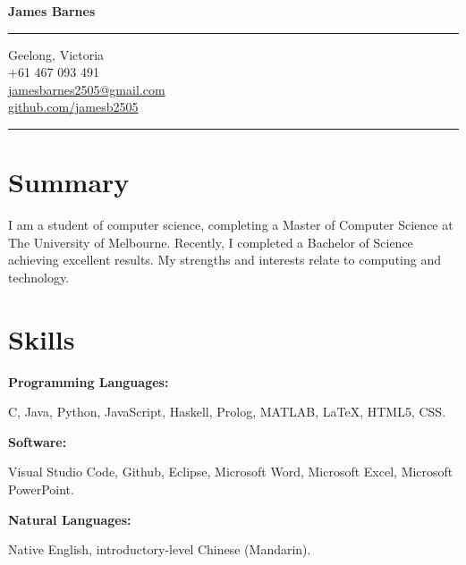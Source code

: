 \documentclass[10pt]{article}
\begin{document}
\pagestyle{empty} 

\begin{minipage}[t]{.35\textwidth}
\vspace*{0pt}

\begin{center}
{\Huge \bfseries James Barnes\par}
\end{center}

\bigskip
\hrule
\bigskip

\begin{center}
Geelong, Victoria \\
+61 467 093 491 \\
\href{mailto:jamesbarnes2505@gmail.com}{jamesbarnes2505@gmail.com} \\
\href{http://github.com/jamesb2505}{github.com/jamesb2505}
\end{center}

\bigskip
\hrule
\bigskip

\section{Summary}

\begin{flushleft}
I am a student of computer science, completing a Master of Computer Science at The University of Melbourne. 
Recently, I completed a Bachelor of Science achieving excellent results.
My strengths and interests relate to computing and technology.
\end{flushleft} 

\medskip

\section{Skills}

\textbf{Programming Languages:}
\begin{flushleft}
C, Java, Python, JavaScript, Haskell, Prolog, MATLAB, {\selectfont \LaTeX{}}, HTML5, CSS. \newline
\end{flushleft}

\textbf{Software:}
\begin{flushleft}
Visual Studio Code, Github, Eclipse, Microsoft Word, Microsoft Excel, Microsoft PowerPoint. \newline
\end{flushleft}

\textbf{Natural Languages:}
\begin{flushleft}
Native English, introductory-level Chinese (Mandarin).
\end{flushleft}


\end{minipage}
\end{document}
